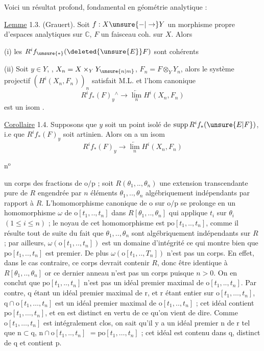 Voici un résultat  profond, fondamental
 en géométrie analytique :

\uline{Lemme} 1.3. (Grauert). Soit $f:X\unsure{-|\to}Y$ un
morphisme propre d'espaces analytiques sur $\mathbb C$,
$F$ un faisceau coh. sur $X$. Alors

(i) les $R^if_{\unsure{*}}(\deleted{\unsure{E}}F)$ sont cohérents

(ii) Soit $y\in Y$, ,
$X_n=X\times_Y Y_{\unsure{n|m}}$, $F_n=F\otimes_Y Y_n$, alors le système
projectif $(H^i(X_n,F_n))_n$ satisfait M.L.
et l'hom canonique
\[
R^if_*(F)_y{}^{\wedge}\longrightarrow\underset{n}{\underleftarrow{\lim}}H^i(X_n,F_n)
\]
est un isom .

\uline{Corollaire} 1.4. Supposons que
$y$ soit un point isolé de $\operatorname{supp} R^if_*(\unsure{E|F})$,
 i.e que $R^if_*(F)_y$ soit artinien.
Alors on a un isom
\[
R^if_*(F)_y\longrightarrow\underset{n}{\underleftarrow{\lim}}H^i(X_n,F_n)
\]

n$^{\mathrm{o}}$ 

un corps des fractions de $\mathrm o/\mathrm p$ ; soit $R(\theta_1,..,\theta_n)$ une extension
transcendante pure de $R$ engendrée par $n$ éléments $\theta_1,..,\theta_n$ algébriquement
indépendants par rapport à $R$. L'homomorphisme canonique de
$\mathrm o$ sur $\mathrm o/\mathrm p$ se prolonge en un homomorphisme $\omega$ de $\mathrm o[t_1,..,t_n]$
dans $R[\theta_1,..,\theta_n]$ qui applique $t_i$ sur $\theta_i$ $(1\leq i\leq n)$ ; le noyau
de cet homomorphisme est $\mathrm{po}[t_1,..,t_n]$, comme il résulte tout
de suite du fait que $\theta_1,..,\theta_n$ sont algébriquement indépendants
sur $R$ ; par ailleurs, $\omega(\mathrm o[t_1,..,t_n])$ est un domaine d'intégrité
ce qui montre bien que $\mathrm{po}[t_1,..,t_n]$ est premier. De plus
$\omega(\mathrm o[t_1,..,T_n])$ n'est pas un corps. En effet, dans le cas contraire,
ce corps devrait contenir $R$, donc être identique à $R[\theta_1,..,\theta_n]$
or ce dernier anneau n'est pas un corps puisque $n>0$. On en conclut
que $\mathrm{po}[t_1,..,t_n]$ n'est pas un idéal premier maximal de
$\mathrm o[t_1,..,t_n]$. Par contre, $\mathrm q$ étant un idéal premier maximal de
$\mathrm r$, et $\mathrm r$ étant entier sur $\mathrm o[t_1,\ldots,t_n]$, $\mathrm q\cap\mathrm o[t_1,\ldots,t_n]$
est un idéal premier maximal de $\mathrm o[t_1,..,t_n]$ ; cet idéal contient
$\mathrm{po}[t_1,\ldots,t_n]$, et en est distinct en vertu de ce qu'on vient
de dire. Comme $\mathrm o[t_1,\ldots,t_n]$ est intégralement clos, on sait
qu'il y a un idéal premier $\mathrm n$ de $\mathrm r$ tel que $\mathrm n\subset\mathrm q$, $\mathrm n\cap\mathrm o[t_1,..,t_n]$
$=\mathrm{po}[t_1,\ldots,t_n]$ ; cet idéal est contenu dans $\mathrm q$, distinct de
$\mathrm q$ et contient $\mathrm p$.

